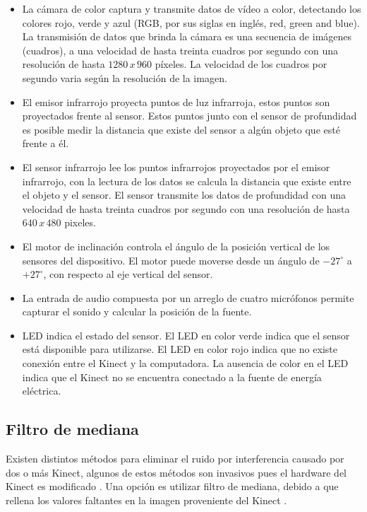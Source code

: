 \begin{itemize}
\item La cámara de color captura y transmite datos de vídeo a color, detectando los colores rojo, verde y azul (RGB, por sus siglas en ingl\'es, red, green and blue). La transmisión de datos que brinda la cámara es una secuencia de imágenes (cuadros), a una velocidad de hasta treinta cuadros por segundo con una resolución de hasta $1280\, x \, 960$ p\'ixeles. La velocidad de los cuadros por segundo varia según la resolución de la imagen.

\item El emisor infrarrojo proyecta puntos de luz infrarroja, estos puntos son proyectados frente al sensor. Estos puntos junto con el sensor de profundidad es posible medir la distancia que existe del sensor a algún objeto que esté frente a él.  

\item El sensor infrarrojo lee los puntos infrarrojos proyectados por el emisor infrarrojo, con la lectura de los datos se calcula la distancia que existe entre el objeto y el sensor. El sensor transmite los datos de profundidad con una velocidad de hasta treinta cuadros por segundo con una resolución de hasta $640 \, x \, 480$ pixeles.   

\item El motor de inclinación controla el \'angulo de la posición vertical de los sensores del dispositivo. El motor puede moverse desde un \'angulo de $-27^ \circ$ a $+27^\circ$, con respecto al eje vertical del sensor.  

\item La entrada de audio compuesta por un arreglo de cuatro micrófonos permite capturar el sonido y calcular la posición de la fuente.

\item LED indica el estado del sensor. El LED en color verde indica que el sensor está disponible para utilizarse. El LED en color rojo indica que no existe conexión entre el Kinect y la computadora. La ausencia de color en el LED indica que el Kinect no se encuentra conectado a la fuente de energía eléctrica.
\end{itemize}

\subsection{Filtro de mediana} 

Existen distintos métodos para eliminar el ruido por interferencia causado por dos o más  Kinect, algunos de estos métodos son invasivos pues el hardware del Kinect es modificado \citep{Mallick2014}. Una opción es utilizar filtro de mediana, debido a que rellena los valores faltantes en la imagen proveniente del Kinect \citep{Maimone2011}. 

